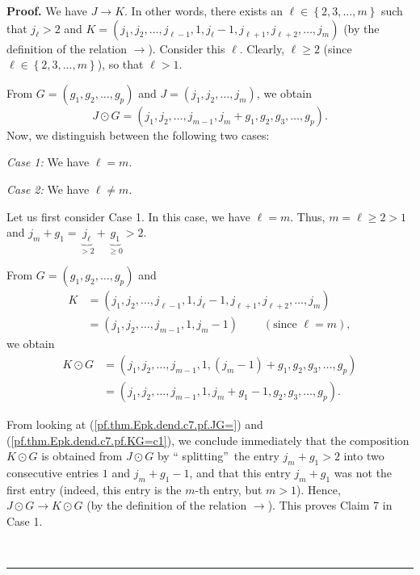 \documentclass[numbers=enddot,12pt,final,onecolumn,notitlepage]{scrartcl}%
\theoremstyle{definition}
\newenvironment{proof}[1][Proof]{\noindent\textbf{#1.} }{\ \rule{0.5em}{0.5em}}
\newenvironment{verlong}{}{}
\begin{document}
\begin{verlong}
\begin{proof}
We have $J\rightarrow K$. In other words, there exists an $\ell\in\left\{
2,3,\ldots,m\right\}  $ such that $j_{\ell}>2$ and $K=\left(  j_{1}%
,j_{2},\ldots,j_{\ell-1},1,j_{\ell}-1,j_{\ell+1},j_{\ell+2},\ldots
,j_{m}\right)  $ (by the definition of the relation $\rightarrow$). Consider
this $\ell$. Clearly, $\ell\geq2$ (since $\ell\in\left\{  2,3,\ldots
,m\right\}  $), so that $\ell>1$.

From $G=\left(  g_{1},g_{2},\ldots,g_{p}\right)  $ and $J=\left(  j_{1}%
,j_{2},\ldots,j_{m}\right)  $, we obtain%
\begin{equation}
J\odot G=\left(  j_{1},j_{2},\ldots,j_{m-1},j_{m}+g_{1},g_{2},g_{3}%
,\ldots,g_{p}\right)  . \label{pf.thm.Epk.dend.c7.pf.JG=}%
\end{equation}
Now, we distinguish between the following two cases:

\textit{Case 1:} We have $\ell=m$.

\textit{Case 2:} We have $\ell\neq m$.

Let us first consider Case 1. In this case, we have $\ell=m$. Thus,
$m=\ell\geq2>1$ and $j_{m}+g_{1}=\underbrace{j_{\ell}}_{>2}+\underbrace{g_{1}%
}_{\geq0}>2$.

From $G=\left(  g_{1},g_{2},\ldots,g_{p}\right)  $ and
\begin{align*}
K  &  =\left(  j_{1},j_{2},\ldots,j_{\ell-1},1,j_{\ell}-1,j_{\ell+1}%
,j_{\ell+2},\ldots,j_{m}\right) \\
&  =\left(  j_{1},j_{2},\ldots,j_{m-1},1,j_{m}-1\right)
\ \ \ \ \ \ \ \ \ \ \left(  \text{since }\ell=m\right)  ,
\end{align*}
we obtain%
\begin{align}
K\odot G  &  =\left(  j_{1},j_{2},\ldots,j_{m-1},1,\left(  j_{m}-1\right)
+g_{1},g_{2},g_{3},\ldots,g_{p}\right) \nonumber\\
&  =\left(  j_{1},j_{2},\ldots,j_{m-1},1,j_{m}+g_{1}-1,g_{2},g_{3}%
,\ldots,g_{p}\right)  . \label{pf.thm.Epk.dend.c7.pf.KG=c1}%
\end{align}


From looking at (\ref{pf.thm.Epk.dend.c7.pf.JG=}) and
(\ref{pf.thm.Epk.dend.c7.pf.KG=c1}), we conclude immediately that the
composition $K\odot G$ is obtained from $J\odot G$ by \textquotedblleft
splitting\textquotedblright\ the entry $j_{m}+g_{1}>2$ into two consecutive
entries $1$ and $j_{m}+g_{1}-1$, and that this entry $j_{m}+g_{1}$ was not the
first entry (indeed, this entry is the $m$-th entry, but $m>1$). Hence,
$J\odot G\rightarrow K\odot G$ (by the definition of the relation
$\rightarrow$). This proves Claim 7 in Case 1.


\end{proof}
\end{verlong}
\end{document}
